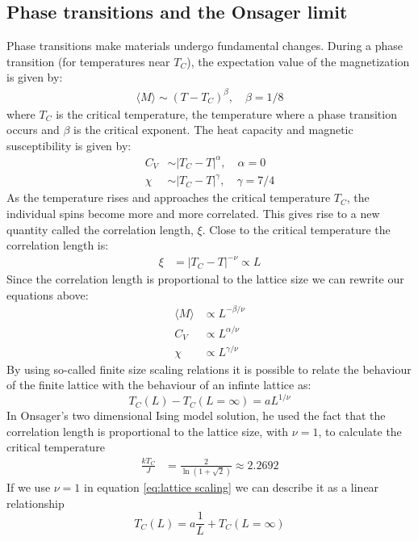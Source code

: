 \documentclass[%
 reprint,
nofootinbib,
aps,
]{revtex4-1}
\begin{document}
\subsection{Phase transitions and the Onsager limit}
Phase transitions make materials undergo fundamental changes. During a phase transition (for temperatures near $T_C$), the expectation value of the magnetization is given by:
\begin{align*}
    \langle M \rangle \sim (T- T_C)^{\beta}, \quad \beta = 1/8
\end{align*}
where $T_C$ is the critical temperature, the temperature where a phase transition occurs and $\beta$ is the critical exponent. The heat capacity and magnetic susceptibility is given by:
\begin{align*}
    C_V &\sim |T_C - T|^{\alpha}, \quad \alpha = 0\\
    \chi &\sim |T_C - T|^{\gamma}, \quad \gamma = 7/4
\end{align*}
\newpage As the temperature rises and approaches the critical temperature $T_C$, the individual spins become more and more correlated. This gives rise to a new quantity called the correlation length, $\xi$. Close to the critical temperature the correlation length is:
\begin{align*}
    \xi &= |T_C - T|^{-\nu} \propto L
\end{align*}
Since the correlation length is proportional to the lattice size we can rewrite our equations above:
\begin{align*}
    \langle M \rangle &\propto L^{-\beta /\nu}\\
    C_V &\propto L^{\alpha /\nu}\\
    \chi &\propto L^{\gamma /\nu}
\end{align*}
By using so-called finite size scaling relations it is possible to relate the behaviour of the finite lattice with the behaviour of an infinte lattice as:
\begin{equation}
    T_C(L) - T_C(L=\infty) = aL^{1/\nu}
    \label{eq:lattice scaling}
\end{equation}
 In Onsager's two dimensional Ising model solution, he used the fact that the correlation length is proportional to the lattice size, with $\nu = 1$, to calculate the critical temperature
\begin{align*}
    \frac{k T_C}{J} &= \frac{2}{\ln{(1+\sqrt{2})}} \approx 2.2692
\end{align*}
If we use $\nu = 1$ in equation \ref{eq:lattice scaling} we can describe it as a linear relationship
\begin{equation}
    T_C(L) = a\frac{1}{L} + T_C(L=\infty)
    \label{eq:findTc}
\end{equation}
\end{document}
